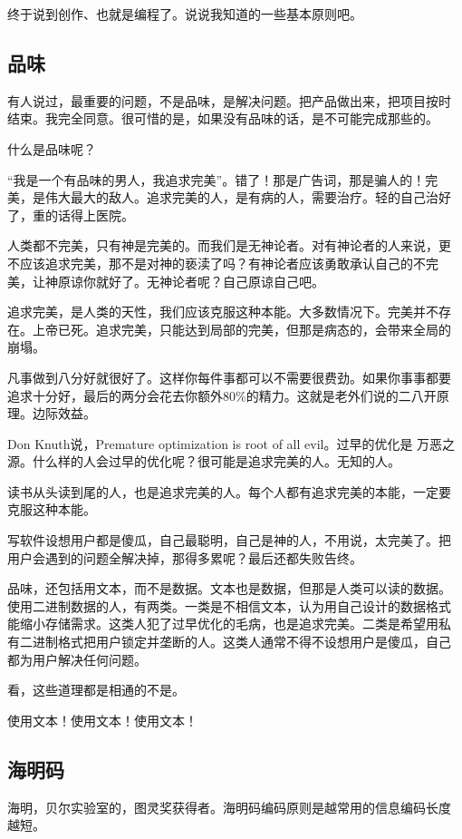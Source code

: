 \documentclass[10pt]{article}
\begin{document}
\begin{CJK*}{UTF8}{simhei}
终于说到创作、也就是编程了。说说我知道的一些基本原则吧。

\subsection{品味}

有人说过，最重要的问题，不是品味，是解决问题。把产品做出来，把项目按时
结束。我完全同意。很可惜的是，如果没有品味的话，是不可能完成那些的。

什么是品味呢？

“我是一个有品味的男人，我追求完美”。错了！那是广告词，那是骗人的！完
美，是伟大最大的敌人。追求完美的人，是有病的人，需要治疗。轻的自己治好
了，重的话得上医院。

人类都不完美，只有神是完美的。而我们是无神论者。对有神论者的人来说，更
不应该追求完美，那不是对神的亵渎了吗？有神论者应该勇敢承认自己的不完
美，让神原谅你就好了。无神论者呢？自己原谅自己吧。

追求完美，是人类的天性，我们应该克服这种本能。大多数情况下。完美并不存
在。上帝已死。追求完美，只能达到局部的完美，但那是病态的，会带来全局的
崩塌。

凡事做到八分好就很好了。这样你每件事都可以不需要很费劲。如果你事事都要
追求十分好，最后的两分会花去你额外80\%的精力。这就是老外们说的二八开原
理。边际效益。

Don Knuth说，Premature optimization is root of all evil。过早的优化是
万恶之源。什么样的人会过早的优化呢？很可能是追求完美的人。无知的人。

读书从头读到尾的人，也是追求完美的人。每个人都有追求完美的本能，一定要
克服这种本能。

写软件设想用户都是傻瓜，自己最聪明，自己是神的人，不用说，太完美了。把
用户会遇到的问题全解决掉，那得多累呢？最后还都失败告终。

品味，还包括用文本，而不是数据。文本也是数据，但那是人类可以读的数据。
使用二进制数据的人，有两类。一类是不相信文本，认为用自己设计的数据格式
能缩小存储需求。这类人犯了过早优化的毛病，也是追求完美。二类是希望用私
有二进制格式把用户锁定并垄断的人。这类人通常不得不设想用户是傻瓜，自己
都为用户解决任何问题。

看，这些道理都是相通的不是。

使用文本！使用文本！使用文本！

\subsection{海明码}

海明，贝尔实验室的，图灵奖获得者。海明码编码原则是越常用的信息编码长度
越短。


\end{CJK*}
\end{document}
